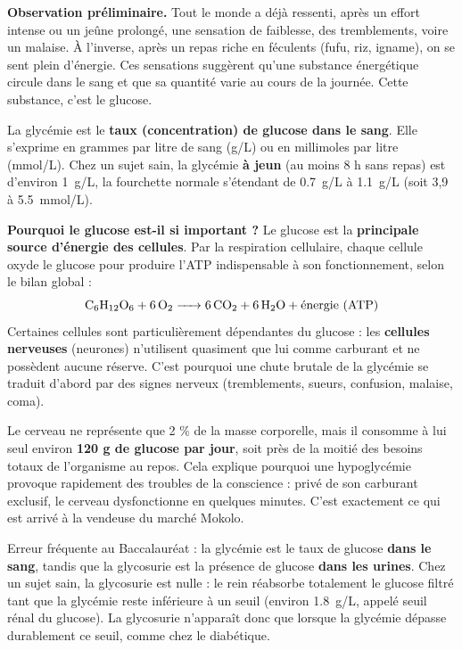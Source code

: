 \documentclass[11pt]{article}
\newcommand{\cle}[1]{{\popxbold\color{popdark}#1}}
\newcounter{popsec}
\newcounter{popsub}
\newcommand{\courssub}[1]{%
  \stepcounter{popsub}%
  \par\vspace{9pt}\noindent{\popxbold\fontsize{11.5}{13}\selectfont\color{popink}{\color{poporange}\thepopsec.\thepopsub}\hspace{6pt}#1}\par\nopagebreak\vspace{4pt}
}
\begin{document}
\courssub{La glycémie : définition et valeur normale}

\textbf{Observation préliminaire.} Tout le monde a déjà ressenti, après un effort intense ou un jeûne prolongé, une sensation de faiblesse, des tremblements, voire un malaise. À l'inverse, après un repas riche en féculents (fufu, riz, igname), on se sent plein d'énergie. Ces sensations suggèrent qu'une substance énergétique circule dans le sang et que sa quantité varie au cours de la journée. Cette substance, c'est le \cle{glucose}.

\begin{definition}[La glycémie]
La \cle{glycémie} est le \textbf{taux (concentration) de glucose dans le sang}. Elle s'exprime en grammes par litre de sang (\si{g/L}) ou en millimoles par litre (\si{mmol/L}). Chez un sujet sain, la glycémie \textbf{à jeun} (au moins 8 h sans repas) est d'environ \SI{1}{g/L}, la fourchette normale s'étendant de \SI{0,7}{g/L} à \SI{1,1}{g/L} (soit 3,9 à \SI{5,5}{mmol/L}).
\end{definition}

\textbf{Pourquoi le glucose est-il si important ?} Le glucose est la \textbf{principale source d'énergie des cellules}. Par la respiration cellulaire, chaque cellule oxyde le glucose pour produire l'ATP indispensable à son fonctionnement, selon le bilan global :
\[ \ce{C6H12O6 + 6O2 -> 6CO2 + 6H2O} + \text{énergie (ATP)} \]
Certaines cellules sont particulièrement dépendantes du glucose : les \textbf{cellules nerveuses} (neurones) n'utilisent quasiment que lui comme carburant et ne possèdent aucune réserve. C'est pourquoi une chute brutale de la glycémie se traduit d'abord par des signes nerveux (tremblements, sueurs, confusion, malaise, coma).

\begin{savaistu}
Le cerveau ne représente que 2 \% de la masse corporelle, mais il consomme à lui seul environ \textbf{120 g de glucose par jour}, soit près de la moitié des besoins totaux de l'organisme au repos. Cela explique pourquoi une hypoglycémie provoque rapidement des troubles de la conscience : privé de son carburant exclusif, le cerveau dysfonctionne en quelques minutes. C'est exactement ce qui est arrivé à la vendeuse du marché Mokolo.
\end{savaistu}

\begin{attention}
Erreur fréquente au Baccalauréat : la \cle{glycémie} est le taux de glucose \textbf{dans le sang}, tandis que la \cle{glycosurie} est la présence de glucose \textbf{dans les urines}. Chez un sujet sain, la glycosurie est nulle : le rein réabsorbe totalement le glucose filtré tant que la glycémie reste inférieure à un seuil (environ \SI{1,8}{g/L}, appelé seuil rénal du glucose). La glycosurie n'apparaît donc que lorsque la glycémie dépasse durablement ce seuil, comme chez le diabétique.
\end{attention}
\end{document}

